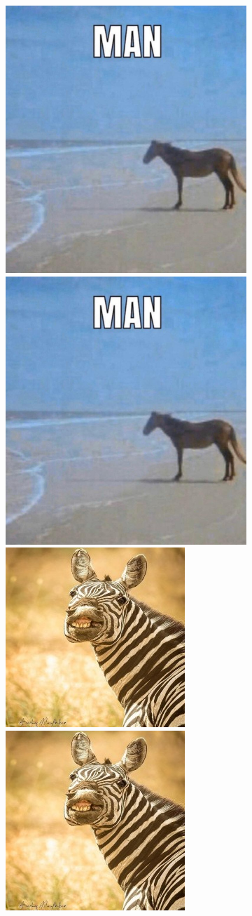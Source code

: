 \documentclass[12pt, fleqn, titlepage]{article}
\newcommand\skipper{1.4pt}
\begin{document}
\begin{figure}[H]
\begin{subfigure}[b]{0.8\textwidth}
		\centering
		\includegraphics[width=0.15\linewidth]{imgs/temp_horse}
		\hskip\skipper
		\includegraphics[width=0.15\linewidth]{imgs/temp_horse}
		\hskip\skipper
		\includegraphics[width=0.15\linewidth]{imgs/temp_zebra}
		\hskip\skipper
		\includegraphics[width=0.15\linewidth]{imgs/temp_zebra}
	\end{subfigure}
\end{figure}
\end{document}
